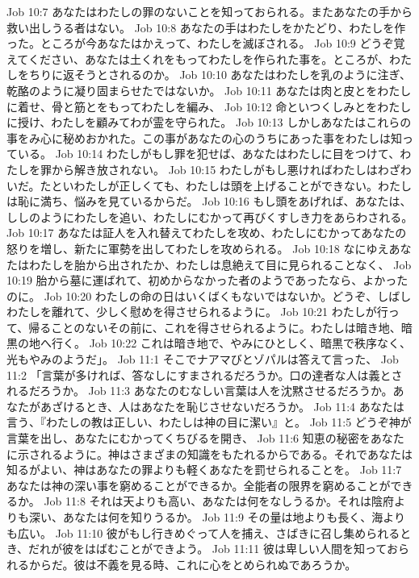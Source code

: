 Job 10:7  あなたはわたしの罪のないことを知っておられる。またあなたの手から救い出しうる者はない。
Job 10:8  あなたの手はわたしをかたどり、わたしを作った。ところが今あなたはかえって、わたしを滅ぼされる。
Job 10:9  どうぞ覚えてください、あなたは土くれをもってわたしを作られた事を。ところが、わたしをちりに返そうとされるのか。
Job 10:10  あなたはわたしを乳のように注ぎ、乾酪のように凝り固まらせたではないか。
Job 10:11  あなたは肉と皮とをわたしに着せ、骨と筋とをもってわたしを編み、
Job 10:12  命といつくしみとをわたしに授け、わたしを顧みてわが霊を守られた。
Job 10:13  しかしあなたはこれらの事をみ心に秘めおかれた。この事があなたの心のうちにあった事をわたしは知っている。
Job 10:14  わたしがもし罪を犯せば、あなたはわたしに目をつけて、わたしを罪から解き放されない。
Job 10:15  わたしがもし悪ければわたしはわざわいだ。たといわたしが正しくても、わたしは頭を上げることができない。わたしは恥に満ち、悩みを見ているからだ。
Job 10:16  もし頭をあげれば、あなたは、ししのようにわたしを追い、わたしにむかって再びくすしき力をあらわされる。
Job 10:17  あなたは証人を入れ替えてわたしを攻め、わたしにむかってあなたの怒りを増し、新たに軍勢を出してわたしを攻められる。
Job 10:18  なにゆえあなたはわたしを胎から出されたか、わたしは息絶えて目に見られることなく、
Job 10:19  胎から墓に運ばれて、初めからなかった者のようであったなら、よかったのに。
Job 10:20  わたしの命の日はいくばくもないではないか。どうぞ、しばしわたしを離れて、少しく慰めを得させられるように。
Job 10:21  わたしが行って、帰ることのないその前に、これを得させられるように。わたしは暗き地、暗黒の地へ行く。
Job 10:22  これは暗き地で、やみにひとしく、暗黒で秩序なく、光もやみのようだ」。
Job 11:1  そこでナアマびとゾパルは答えて言った、
Job 11:2  「言葉が多ければ、答なしにすまされるだろうか。口の達者な人は義とされるだろうか。
Job 11:3  あなたのむなしい言葉は人を沈黙させるだろうか。あなたがあざけるとき、人はあなたを恥じさせないだろうか。
Job 11:4  あなたは言う、『わたしの教は正しい、わたしは神の目に潔い』と。
Job 11:5  どうぞ神が言葉を出し、あなたにむかってくちびるを開き、
Job 11:6  知恵の秘密をあなたに示されるように。神はさまざまの知識をもたれるからである。それであなたは知るがよい、神はあなたの罪よりも軽くあなたを罰せられることを。
Job 11:7  あなたは神の深い事を窮めることができるか。全能者の限界を窮めることができるか。
Job 11:8  それは天よりも高い、あなたは何をなしうるか。それは陰府よりも深い、あなたは何を知りうるか。
Job 11:9  その量は地よりも長く、海よりも広い。
Job 11:10  彼がもし行きめぐって人を捕え、さばきに召し集められるとき、だれが彼をはばむことができよう。
Job 11:11  彼は卑しい人間を知っておられるからだ。彼は不義を見る時、これに心をとめられぬであろうか。
